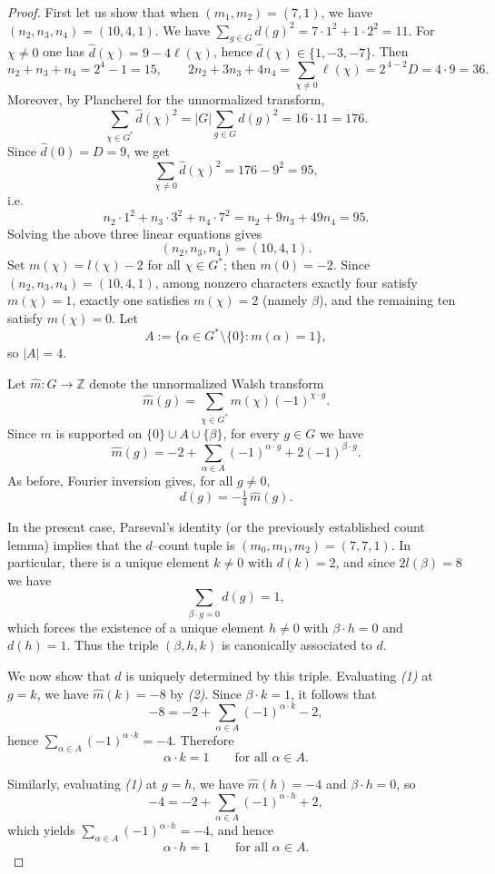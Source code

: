 \documentclass[12pt,twoside,]{amsart}
\theoremstyle{plain}
\theoremstyle{definition}
\begin{document}
\begin{proof}
First let us show that when $(m_1, m_2) = (7,1)$, we have $(n_2, n_3, n_4) = (10,4,1)$. 
We have $\sum_{g\in G} d(g)^2=7\cdot 1^2+1\cdot 2^2=11$.
For $\chi\neq 0$ one has $\widehat d(\chi)=9-4\ell(\chi)$, hence
$\widehat d(\chi)\in\{1,-3,-7\}$.
Then
\[
n_2+n_3+n_4=2^4-1=15,
\qquad
2n_2+3n_3+4n_4=\sum_{\chi\neq 0}\ell(\chi)=2^{\,4-2}D=4\cdot 9=36.
\]
Moreover, by Plancherel for the unnormalized transform,
\[
\sum_{\chi\in G^*}\widehat d(\chi)^2=|G|\sum_{g\in G} d(g)^2=16\cdot 11=176.
\]
Since $\widehat d(0)=D=9$, we get
\[
\sum_{\chi\neq 0}\widehat d(\chi)^2=176-9^2=95,
\]
i.e.
\[
n_2\cdot 1^2+n_3\cdot 3^2+n_4\cdot 7^2=n_2+9n_3+49n_4=95.
\]
Solving the above three linear equations gives
\[
(n_2,n_3,n_4)=(10,4,1).
\]
Set $m(\chi)=l(\chi)-2$ for all $\chi\in G^*$; then $m(0)=-2$.  Since
$(n_2,n_3,n_4)=(10,4,1)$, among nonzero characters exactly four satisfy $m(\chi)=1$,
exactly one satisfies $m(\chi)=2$ (namely $\beta$), and the remaining ten satisfy
$m(\chi)=0$.  Let
\[
A:=\{\alpha\in G^*\setminus\{0\}: m(\alpha)=1\},
\]
so $|A|=4$.

Let $\widehat m:G\to\mathbb Z$ denote the unnormalized Walsh transform
\[
\widehat m(g)=\sum_{\chi\in G^*} m(\chi)(-1)^{\chi\cdot g}.
\]
Since $m$ is supported on $\{0\}\cup A\cup\{\beta\}$, for every $g\in G$ we have
\[
\widehat m(g)
=
-2+\sum_{\alpha\in A}(-1)^{\alpha\cdot g}
+2(-1)^{\beta\cdot g}.
\tag{1}
\]
As before, Fourier inversion gives, for all $g\neq0$,
\[
d(g)=-\tfrac14\,\widehat m(g).
\tag{2}
\]

In the present case, Parseval's identity (or the previously established count
lemma) implies that the $d$--count tuple is $(m_0,m_1,m_2)=(7,7,1)$.  In particular,
there is a unique element $k\neq0$ with $d(k)=2$, and since $2l(\beta)=8$ we have
\[
\sum_{\beta\cdot g=0} d(g)=1,
\]
which forces the existence of a unique element $h\neq0$ with $\beta\cdot h=0$ and
$d(h)=1$.  Thus the triple $(\beta,h,k)$ is canonically associated to $d$.

We now show that $d$ is uniquely determined by this triple.  Evaluating
\emph{(1)} at $g=k$, we have $\widehat m(k)=-8$ by \emph{(2)}.  Since
$\beta\cdot k=1$, it follows that
\[
-8=-2+\sum_{\alpha\in A}(-1)^{\alpha\cdot k}-2,
\]
hence $\sum_{\alpha\in A}(-1)^{\alpha\cdot k}=-4$.  Therefore
\[
\alpha\cdot k=1
\qquad\text{for all }\alpha\in A.
\tag{3}
\]

Similarly, evaluating \emph{(1)} at $g=h$, we have $\widehat m(h)=-4$ and
$\beta\cdot h=0$, so
\[
-4=-2+\sum_{\alpha\in A}(-1)^{\alpha\cdot h}+2,
\]
which yields $\sum_{\alpha\in A}(-1)^{\alpha\cdot h}=-4$, and hence
\[
\alpha\cdot h=1
\qquad\text{for all }\alpha\in A.
\tag{4}
\]


\end{proof}
\end{document}
